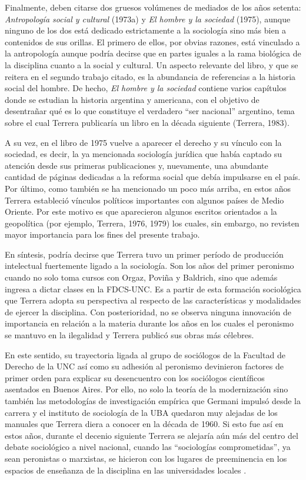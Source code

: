 Finalmente, deben citarse dos gruesos volúmenes de mediados de los años setenta: \emph{Antropología social y cultural} (1973a) y \emph{El hombre y la sociedad} (1975), aunque ninguno de los dos está dedicado estrictamente a la sociología sino más bien a contenidos de sus orillas. El primero de ellos, por obvias razones, está vinculado a la antropología aunque podría decirse que en partes iguales a la rama biológica de la disciplina cuanto a la social y cultural. Un aspecto relevante del libro, y que se reitera en el segundo trabajo citado, es la abundancia de referencias a la historia social del hombre. De hecho, \emph{El hombre y la sociedad} contiene varios capítulos donde se estudian la historia argentina y americana, con el objetivo de desentrañar qué es lo que constituye el verdadero \enquote{ser nacional} argentino, tema sobre el cual Terrera publicaría un libro en la década siguiente (Terrera, 1983).

A su vez, en el libro de 1975 vuelve a aparecer el derecho y su vínculo con la sociedad, es decir, la ya mencionada sociología jurídica que había captado su atención desde sus primeras publicaciones y, nuevamente, una abundante cantidad de páginas dedicadas a la reforma social que debía impulsarse en el país. Por último, como también se ha mencionado un poco más arriba, en estos años Terrera estableció vínculos políticos importantes con algunos países de Medio Oriente. Por este motivo es que aparecieron algunos escritos orientados a la geopolítica (por ejemplo, Terrera, 1976, 1979) los cuales, sin embargo, no revisten mayor importancia para los fines del presente trabajo.

En síntesis, podría decirse que Terrera tuvo un primer período de producción intelectual fuertemente ligado a la sociología. Son los años del primer peronismo cuando no solo toma cursos con Orgaz, Poviña y Baldrich, sino que además ingresa a dictar clases en la FDCS-UNC. Es a partir de esta formación sociológica que Terrera adopta su perspectiva al respecto de las características y modalidades de ejercer la disciplina. Con posterioridad, no se observa ninguna innovación de importancia en relación a la materia durante los años en los cuales el peronismo se mantuvo en la ilegalidad y Terrera publicó sus obras más célebres.

En este sentido, su trayectoria ligada al grupo de sociólogos de la Facultad de Derecho de la UNC así como su adhesión al peronismo devinieron factores de primer orden para explicar su desencuentro con los sociólogos científicos asentados en Buenos Aires. Por ello, no solo la teoría de la modernización sino también las metodologías de investigación empírica que Germani impulsó desde la carrera y el instituto de sociología de la UBA quedaron muy alejadas de los manuales que Terrera diera a conocer en la década de 1960. Si esto fue así en estos años, durante el decenio siguiente Terrera se alejaría aún más del centro del debate sociológico a nivel nacional, cuando las \enquote{sociologías comprometidas}, ya sean peronistas o marxistas, se hicieron con los lugares de preeminencia en los espacios de enseñanza de la disciplina en las universidades locales \parencite{1508-SIDICARO1993}.

